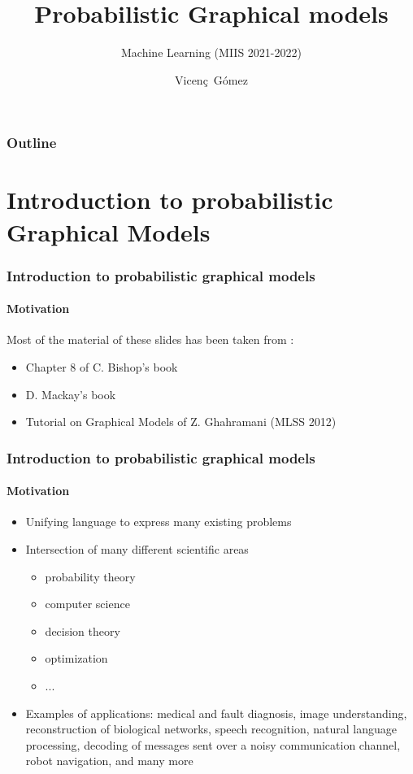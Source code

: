 \documentclass[slidestop,compress,mathserif]{beamer}
\title[Probabilistic Graphical models]
{Probabilistic Graphical models}
\subtitle
{Machine Learning (MIIS 2021-2022)} %
\author[\hspace{10cm}]{
  Vicen\c{c}~G\'omez}
\institute[Machine Learning (MIIS)] %
{ 
Department of Information and Communication Technologies \\
Universitat Pompeu Fabra \\
}
\date[] %
\newcommand{\bi}{\begin{itemize}}
\newcommand{\ei}{\end{itemize}}
\begin{document}
\begin{frame}
  \titlepage
\end{frame}

\begin{frame}
  \frametitle{Outline}
  \tableofcontents%
\end{frame}

\section{Introduction to probabilistic Graphical Models}

\begin{frame}
	\frametitle{Introduction to probabilistic graphical models}
	\framesubtitle{Motivation}
    Most of the material of these slides has been taken
    from :
    \begin{itemize}
    \item Chapter 8 of C. Bishop's book
    \item D. Mackay's book
    \item Tutorial on Graphical Models of Z. Ghahramani (MLSS 2012)
    \end{itemize}
    \end{frame}



\begin{frame}
	\frametitle{Introduction to probabilistic graphical models}
	\framesubtitle{Motivation}

    \bi
    \item Unifying language to express many existing problems
    \item Intersection of many different scientific areas 
    \begin{itemize}
    \item probability theory
    \item computer science
    \item decision theory
    \item optimization
    \item ...
    \end{itemize}
    \item Examples of applications:
medical and fault diagnosis, image understanding, reconstruction of
biological networks, speech recognition, natural language processing, decoding
of messages sent over a noisy communication channel, robot navigation, and many
more
    \ei
\end{frame}
\end{document}
